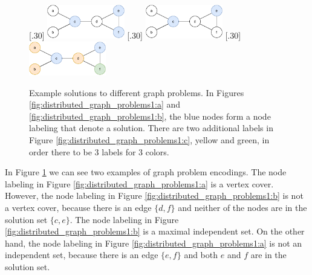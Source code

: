 \begin{figure}[H]
    [.30\linewidth] {
    \centering
    \includegraphics[width=0.30\textwidth]{diagrams/formalizing_pn_network_6.pdf}
  }
  \hfill
    [.30\linewidth] {
    \centering
    \includegraphics[width=0.30\textwidth]{diagrams/formalizing_pn_network_7.pdf}
  }
  \hfill
    [.30\linewidth] {
    \centering
    \includegraphics[width=0.30\textwidth]{diagrams/formalizing_pn_network_8.pdf}
  }
  \caption{Example solutions to different graph problems.
  In Figures \ref{fig:distributed_graph_problems1:a} and \ref{fig:distributed_graph_problems1:b}, the blue nodes form a node labeling that denote a solution.
  There are two additional labels in Figure \ref{fig:distributed_graph_problems1:c}, yellow and green, in order there to be 3 labels for 3 colors.
  }
  \label{fig:distributed_graph_problems1}
\end{figure}

In Figure \ref{fig:distributed_graph_problems1} we can see two examples of graph problem encodings.
The node labeling in Figure \ref{fig:distributed_graph_problems1:a} is a vertex cover.
However, the node labeling in Figure \ref{fig:distributed_graph_problems1:b} is not a vertex cover, because there is an edge $\{d, f\}$ and neither of the nodes are in the solution set $\{c, e\}$.
The node labeling in Figure \ref{fig:distributed_graph_problems1:b} is a maximal independent set.
On the other hand, the node labeling in Figure \ref{fig:distributed_graph_problems1:a} is not an independent set, because there is an edge $\{e, f\}$ and both $e$ and $f$ are in the solution set.



